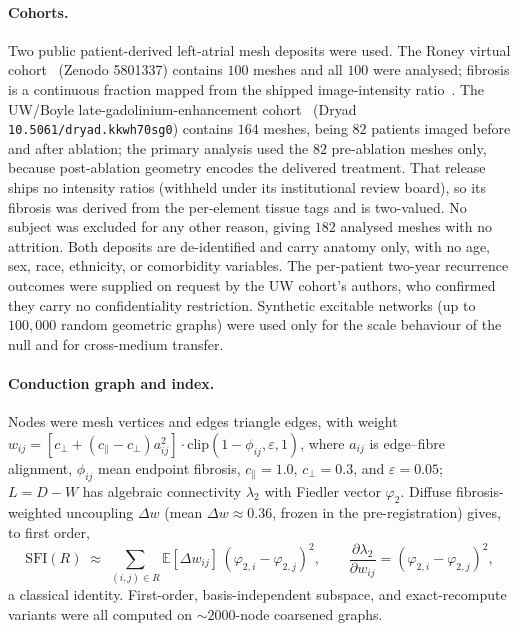 \documentclass[11pt]{article}
\newcommand{\lam}{\lambda}
\newcommand{\phii}{\varphi}
\newcommand{\SFI}{\ensuremath{\mathrm{SFI}}}
\newcommand{\code}[1]{\texttt{#1}}
\begin{document}
\paragraph{Cohorts.} Two public patient-derived left-atrial mesh deposits were
used. The Roney virtual cohort~\cite{roney2022} (Zenodo 5801337) contains $100$ meshes and all
$100$ were analysed; fibrosis is a continuous fraction mapped from the shipped
image-intensity ratio~\cite{khurram2014}. The UW/Boyle late-gadolinium-enhancement cohort~\cite{uwboyle2025} (Dryad
\code{10.5061/dryad.kkwh70sg0}) contains $164$ meshes, being $82$ patients imaged
before and after ablation; the primary analysis used the $82$ pre-ablation meshes
only, because post-ablation geometry encodes the delivered treatment. That
release ships no intensity ratios (withheld under its institutional review
board), so its fibrosis was derived from the per-element tissue tags and is
two-valued. No subject was excluded for any other reason, giving $182$ analysed
meshes with no attrition. Both deposits are de-identified and carry anatomy only,
with no age, sex, race, ethnicity, or comorbidity variables. The per-patient
two-year recurrence outcomes were supplied on request by the UW cohort's authors,
who confirmed they carry no confidentiality restriction. Synthetic excitable
networks (up to $100{,}000$ random geometric graphs) were used only for the scale
behaviour of the null and for cross-medium transfer.

\paragraph{Conduction graph and index.} Nodes were mesh vertices and edges
triangle edges, with weight
$w_{ij}=[c_\perp+(c_\parallel-c_\perp)a_{ij}^{2}]\cdot\mathrm{clip}(1-\phi_{ij},\varepsilon,1)$,
where $a_{ij}$ is edge--fibre alignment, $\phi_{ij}$ mean endpoint fibrosis,
$c_\parallel=1.0$, $c_\perp=0.3$, and $\varepsilon=0.05$; $L=D-W$ has algebraic
connectivity $\lam_2$ with Fiedler vector $\phii_2$. Diffuse fibrosis-weighted
uncoupling $\Delta w$ (mean $\Delta w\approx0.36$, frozen in the pre-registration)
gives, to first order,
\begin{equation}
\SFI(R)\;\approx\;\sum_{(i,j)\in R}\mathbb{E}[\Delta w_{ij}]\,
(\phii_{2,i}-\phii_{2,j})^{2},
\qquad
\frac{\partial\lam_2}{\partial w_{ij}}=(\phii_{2,i}-\phii_{2,j})^{2},
\end{equation}
a classical identity. First-order, basis-independent subspace, and
exact-recompute variants were all computed on $\sim\!2000$-node coarsened graphs.
\end{document}
